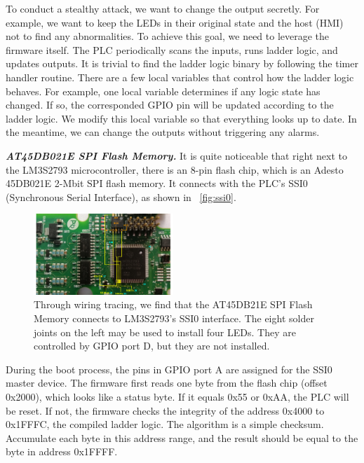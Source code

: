 To conduct a stealthy attack, we want to change the output secretly. For example, we want to keep the LEDs in their original state and the host (HMI) not to find any abnormalities. To achieve this goal, we need to leverage the firmware itself. The PLC periodically scans the inputs, runs ladder logic, and updates outputs.  It is trivial to find the ladder logic binary by following the timer handler routine. There are a few local variables that control how the ladder logic behaves. For example, one local variable determines if any logic state has changed. If so, the corresponded GPIO pin will be updated according to the ladder logic. We modify this local variable so that everything looks up to date. In the meantime,  we can change the outputs without triggering any alarms.



\textbf{\textit{AT45DB021E SPI Flash Memory.}}  It is quite noticeable that right next to the LM3S2793 microcontroller,  there is an 8-pin flash chip, which is an Adesto 45DB021E 2-Mbit SPI flash memory. It connects with the PLC's SSI0 (Synchronous Serial Interface), as shown in ~\autoref{fig:ssi0}.

\begin{figure}[th]
	\includegraphics[width=0.47\textwidth]{figures/ssi0}
	\centering
	\caption{Through wiring tracing, we find that the AT45DB21E SPI Flash Memory connects to LM3S2793's SSI0 interface. The eight solder joints on the left may be used to install four LEDs. They are controlled by GPIO port D,  but they are not installed.}
	\label{fig:ssi0}
\end{figure}


During the boot process, the pins in GPIO port A are assigned for the SSI0 master device. The firmware first reads one byte from the flash chip (offset 0x2000), which looks like a status byte. If it equals 0x55 or 0xAA, the PLC will be reset. If not, the firmware checks the integrity of the address 0x4000 to 0x1FFFC, the compiled ladder logic. The algorithm is a simple checksum. Accumulate each byte in this address range, and the result should be equal to the byte in address 0x1FFFF.

